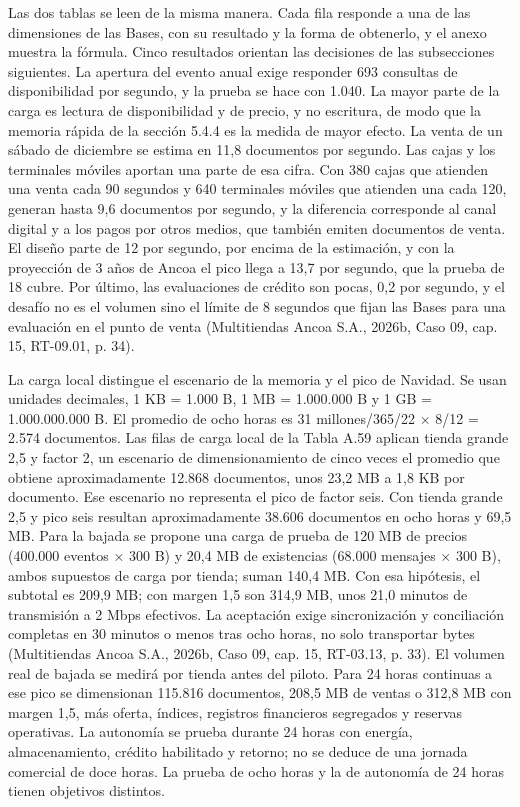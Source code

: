 \documentclass[11pt]{article}
\begin{document}
Las dos tablas se leen de la misma manera. Cada fila responde a una de las dimensiones de las Bases, con su resultado y la forma de obtenerlo, y el anexo muestra la fórmula. Cinco resultados orientan las decisiones de las subsecciones siguientes. La apertura del evento anual exige responder 693 consultas de disponibilidad por segundo, y la prueba se hace con 1.040. La mayor parte de la carga es lectura de disponibilidad y de precio, y no escritura, de modo que la memoria rápida de la sección 5.4.4 es la medida de mayor efecto. La venta de un sábado de diciembre se estima en 11,8 documentos por segundo. Las cajas y los terminales móviles aportan una parte de esa cifra. Con 380 cajas que atienden una venta cada 90 segundos y 640 terminales móviles que atienden una cada 120, generan hasta 9,6 documentos por segundo, y la diferencia corresponde al canal digital y a los pagos por otros medios, que también emiten documentos de venta. El diseño parte de 12 por segundo, por encima de la estimación, y con la proyección de 3 años de Ancoa el pico llega a 13,7 por segundo, que la prueba de 18 cubre. Por último, las evaluaciones de crédito son pocas, 0,2 por segundo, y el desafío no es el volumen sino el límite de 8 segundos que fijan las Bases para una evaluación en el punto de venta (Multitiendas Ancoa S.A., 2026b, Caso 09, cap. 15, RT-09.01, p. 34).

La carga local distingue el escenario de la memoria y el pico de Navidad. Se usan unidades decimales, 1 KB = 1.000 B, 1 MB = 1.000.000 B y 1 GB = 1.000.000.000 B. El promedio de ocho horas es 31 millones/365/22 × 8/12 = 2.574 documentos. Las filas de carga local de la Tabla A.59 aplican tienda grande 2,5 y factor 2, un escenario de dimensionamiento de cinco veces el promedio que obtiene aproximadamente 12.868 documentos, unos 23,2 MB a 1,8 KB por documento. Ese escenario no representa el pico de factor seis. Con tienda grande 2,5 y pico seis resultan aproximadamente 38.606 documentos en ocho horas y 69,5 MB. Para la bajada se propone una carga de prueba de 120 MB de precios (400.000 eventos × 300 B) y 20,4 MB de existencias (68.000 mensajes × 300 B), ambos supuestos de carga por tienda; suman 140,4 MB. Con esa hipótesis, el subtotal es 209,9 MB; con margen 1,5 son 314,9 MB, unos 21,0 minutos de transmisión a 2 Mbps efectivos. La aceptación exige sincronización y conciliación completas en 30 minutos o menos tras ocho horas, no solo transportar bytes (Multitiendas Ancoa S.A., 2026b, Caso 09, cap. 15, RT-03.13, p. 33). El volumen real de bajada se medirá por tienda antes del piloto. Para 24 horas continuas a ese pico se dimensionan 115.816 documentos, 208,5 MB de ventas o 312,8 MB con margen 1,5, más oferta, índices, registros financieros segregados y reservas operativas. La autonomía se prueba durante 24 horas con energía, almacenamiento, crédito habilitado y retorno; no se deduce de una jornada comercial de doce horas. La prueba de ocho horas y la de autonomía de 24 horas tienen objetivos distintos.
\end{document}
